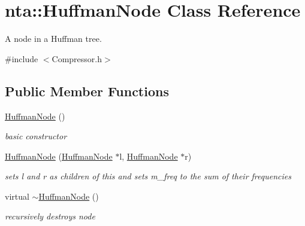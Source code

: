 \hypertarget{classnta_1_1HuffmanNode}{}\section{nta\+:\+:Huffman\+Node Class Reference}
\label{classnta_1_1HuffmanNode}


A node in a Huffman tree.  




{\ttfamily \#include $<$Compressor.\+h$>$}

\subsection*{Public Member Functions}
\begin{DoxyCompactItemize}
\item 
\mbox{\label{classnta_1_1HuffmanNode_a6e92a7ee38fd56994c2eb2d894d3d108}} 
\hyperlink{classnta_1_1HuffmanNode_a6e92a7ee38fd56994c2eb2d894d3d108}{Huffman\+Node} ()
\begin{DoxyCompactList}\small\item\em basic constructor \end{DoxyCompactList}\item 
\mbox{\label{classnta_1_1HuffmanNode_ae9aa27c2ed1cd215e3fe6a5fc48a0527}} 
\hyperlink{classnta_1_1HuffmanNode_ae9aa27c2ed1cd215e3fe6a5fc48a0527}{Huffman\+Node} (\hyperlink{classnta_1_1HuffmanNode}{Huffman\+Node} $\ast$l, \hyperlink{classnta_1_1HuffmanNode}{Huffman\+Node} $\ast$r)
\begin{DoxyCompactList}\small\item\em sets l and r as children of this and sets m\+\_\+freq to the sum of their frequencies \end{DoxyCompactList}\item 
\mbox{\label{classnta_1_1HuffmanNode_a45afade3ee4a50baba8daa66edd32e72}} 
virtual \hyperlink{classnta_1_1HuffmanNode_a45afade3ee4a50baba8daa66edd32e72}{$\sim$\+Huffman\+Node} ()
\begin{DoxyCompactList}\small\item\em recursively destroys node \end{DoxyCompactList}\item 
\mbox{\label{classnta_1_1HuffmanNode_abbdee24e11a5a72a54f6187228f9b7f0}} 

\end{DoxyCompactItemize}
